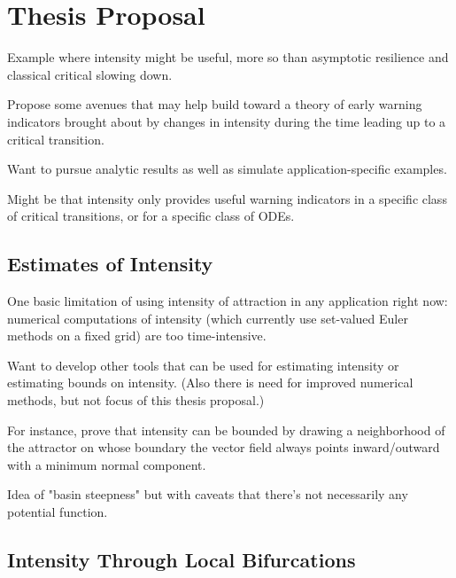 \section{Thesis Proposal}
\label{sec:proposal}

Example where intensity might be useful, more so than asymptotic resilience and classical critical slowing down. 

Propose some avenues that may help build toward a theory of early warning indicators brought about by changes in intensity during the time leading up to a critical transition. 

Want to pursue analytic results as well as simulate application-specific examples. 

Might be that intensity only provides useful warning indicators in a specific class of critical transitions, or for a specific class of ODEs. 


\subsection{Estimates of Intensity}
One basic limitation of using intensity of attraction in any application right now: numerical computations of intensity (which currently use set-valued Euler methods on a fixed grid) are too time-intensive. 

Want to develop other tools that can be used for estimating intensity or estimating bounds on intensity. (Also there is need for improved numerical methods, but not focus of this thesis proposal.)

For instance, prove that intensity can be bounded by drawing a neighborhood of the attractor on whose boundary the vector field always points inward/outward with a minimum normal component.

Idea of "basin steepness" but with caveats that there's not necessarily any potential function. 


\subsection{Intensity Through Local Bifurcations}

